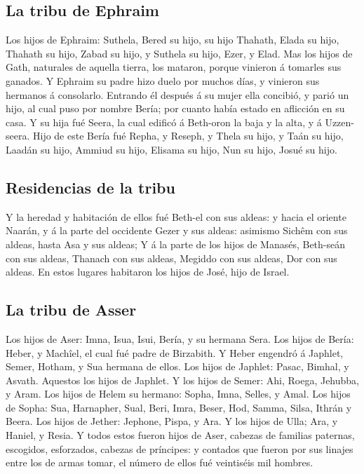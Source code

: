 \hypertarget{la-tribu-de-ephraim}{%
\subsection{La tribu de Ephraim}\label{la-tribu-de-ephraim}}

 Los hijos de Ephraim: Suthela, Bered su hijo, su hijo
Thahath, Elada su hijo, Thahath su hijo,  Zabad su hijo,
y Suthela su hijo, Ezer, y Elad. Mas los hijos de Gath, naturales de
aquella tierra, los mataron, porque vinieron á tomarles sus ganados.
 Y Ephraim su padre hizo duelo por muchos días, y
vinieron sus hermanos á consolarlo.  Entrando él después
á su mujer ella concibió, y parió un hijo, al cual puso por nombre
Bería; por cuanto había estado en aflicción en su casa. 
Y su hija fué Seera, la cual edificó á Beth-oron la baja y la alta, y á
Uzzen-seera.  Hijo de este Bería fué Repha, y Reseph, y
Thela su hijo, y Taán su hijo,  Laadán su hijo, Ammiud su
hijo, Elisama su hijo,  Nun su hijo, Josué su hijo.

\hypertarget{residencias-de-la-tribu}{%
\subsection{Residencias de la tribu}\label{residencias-de-la-tribu}}

 Y la heredad y habitación de ellos fué Beth-el con sus
aldeas: y hacia el oriente Naarán, y á la parte del occidente Gezer y
sus aldeas: asimismo Sichêm con sus aldeas, hasta Asa y sus aldeas;
 Y á la parte de los hijos de Manasés, Beth-seán con sus
aldeas, Thanach con sus aldeas, Megiddo con sus aldeas, Dor con sus
aldeas. En estos lugares habitaron los hijos de José, hijo de Israel.

\hypertarget{la-tribu-de-asser}{%
\subsection{La tribu de Asser}\label{la-tribu-de-asser}}

 Los hijos de Aser: Imna, Isua, Isui, Bería, y su hermana
Sera.  Los hijos de Bería: Heber, y Machîel, el cual fué
padre de Birzabith.  Y Heber engendró á Japhlet, Semer,
Hotham, y Sua hermana de ellos.  Los hijos de Japhlet:
Pasac, Bimhal, y Asvath. Aquestos los hijos de Japhlet. 
Y los hijos de Semer: Ahi, Roega, Jehubba, y Aram.  Los
hijos de Helem su hermano: Sopha, Imna, Selles, y Amal. 
Los hijos de Sopha: Sua, Harnapher, Sual, Beri, Imra, 
Beser, Hod, Samma, Silsa, Ithrán y Beera.  Los hijos de
Jether: Jephone, Pispa, y Ara.  Y los hijos de Ulla; Ara,
y Haniel, y Resia.  Y todos estos fueron hijos de Aser,
cabezas de familias paternas, escogidos, esforzados, cabezas de
príncipes: y contados que fueron por sus linajes entre los de armas
tomar, el número de ellos fué veintiséis mil hombres.

